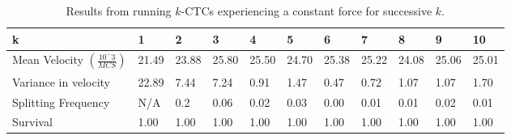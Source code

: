 \documentclass[12pt]{article}
\begin{document}
\begin{table}[H]
	\begin{tabular}{|l|l|l|l|l|l|l|l|l|l|l|}
	\hline
	k                                         & 1     & 2     & 3     & 4     & 5     & 6     & 7     & 8     & 9     & 10    \\ \hline
	Mean Velocity $(\frac{10^-3}{MCS})$ & 21.49 & 23.88 & 25.80 & 25.50 & 24.70 & 25.38 & 25.22 & 24.08 & 25.06 & 25.01 \\ \hline
	Variance in velocity 							& 22.89		&	7.44	&	7.24	&	0.91	&	1.47	&	0.47	&	0.72	&	1.07	&	1.07	&	1.70 \\ \hline
	Splitting Frequency              & N/A   & 0.2   & 0.06  & 0.02  & 0.03  & 0.00  & 0.01  & 0.01  & 0.02  & 0.01  \\ \hline
	Survival             & 1.00  & 1.00  & 1.00  & 1.00  & 1.00  & 1.00  & 1.00  & 1.00  & 1.00  & 1.00 \\ \hline
	\end{tabular}
	\caption{Results from running $k$-CTCs experiencing a constant force for successive $k$.}
	\label{racestats}
\end{table}
\pagebreak
\end{document}
